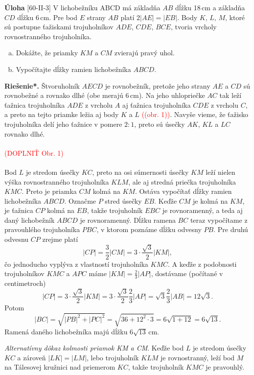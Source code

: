 \documentclass{article}
\newcommand{\rieh}{\textbf{Riešenie*.} }
\newcommand\todo[1]{\noindent\textcolor{red}{(#1)}}
\newcommand{\problem}[4]{
  \begin{tcolorbox}[breakable,notitle,boxrule=0pt,colback=light-gray,colframe=light-gray]
    \textbf{Úloha}
    [#1] #3
  \end{tcolorbox}
  \noindent#4
}
\begin{document}
\problem{60-II-3}{}{
V lichobežníku ABCD má základňa $AB$ dĺžku 18\,cm a základňa $CD$ dĺžku 6\,cm. Pre bod $E$ strany $AB$ platí $2|AE| = |EB|$. Body $K$, $L$, $M$, ktoré sú postupne ťažiskami trojuholníkov $ADE$, $CDE$, $BCE$, tvoria vrcholy rovnostranného trojuholníka.
\begin{enumerate}[a)]
    \item Dokážte, že priamky $KM$ a $CM$ zvierajú pravý uhol.
    \item Vypočítajte dĺžky ramien lichobežníka $ABCD$.
\end{enumerate}
}{
\rieh Štvoruholník $AECD$ je rovnobežník, pretože jeho strany $AE$ a $CD$ sú rovnobežné a rovnako dlhé (obe merajú 6\,cm). Na jeho uhlopriečke $AC$ tak leží ťažnica trojuholníka $ADE$ z vrcholu $A$ aj ťažnica trojuholníka $CDE$ z vrcholu $C$, a preto na tejto priamke ležia aj body $K$ a $L$ \todo{(obr. 1)}. Navyše vieme, že ťažisko trojuholníka delí jeho ťažnice v pomere $2 : 1$, preto sú úsečky $AK$, $KL$ a $LC$ rovnako dlhé.\\
\\
\todo{DOPLNIŤ Obr. 1}\\
\\
Bod $L$ je stredom úsečky $KC$, preto na osi súmernosti úsečky $KM$ leží nielen výška rovnostranného trojuholníka $KLM$, ale aj stredná priečka trojuholníka $KMC$. Preto je priamka $CM$ kolmá na $KM$. Ostáva vypočítať dĺžky ramien lichobežníka $ABCD$. Označme $P$ stred úsečky $EB$. Keďže $CM$ je kolmá na $KM$, je ťažnica $CP$ kolmá na $EB$, takže trojuholník $EBC$ je rovnoramenný, a teda aj daný lichobežník $ABCD$ je rovnoramenný. Dĺžku ramena $BC$ teraz vypočítame z pravouhlého trojuholníka $PBC$, v ktorom poznáme dĺžku odvesny $PB$. Pre druhú odvesnu $CP$ zrejme platí
$$|CP| = \frac{3}{2} |CM| = 3\cdot \frac{\sqrt{3}}{2}|KM|,$$
čo jednoducho vyplýva z vlastností trojuholníka $KMC$. A keďže z podobnosti trojuholníkov $KMC$ a $APC$ máme $|KM| =\frac{2}{3}|AP|$, dostávame (počítané v centimetroch)
$$|CP| = 3\cdot \frac{\sqrt{3}}{2}|KM| = 3\cdot \frac{\sqrt{3}}{2}\frac{2}{3}|AP| =\sqrt{3}\frac{2}{3}|AB| = 12\sqrt{3}.$$
Potom
$$|BC| =\sqrt{|PB|^2 + |PC|^2} =\sqrt{36 + 12^2\cdot3} = 6\sqrt{1 + 12} = 6\sqrt{13}.$$
Ramená daného lichobežníka majú dĺžku $6\sqrt{13}$\,cm.

\textit{Alternatívny dôkaz kolmosti priamok KM a CM}. Keďže bod $L$ je stredom úsečky $KC$ a zároveň $|LK| = |LM|$, lebo trojuholník $KLM$ je rovnostranný, leží bod $M$ na Tálesovej kružnici nad priemerom $KC$, takže trojuholník $KMC$ je pravouhlý.
}
\end{document}
